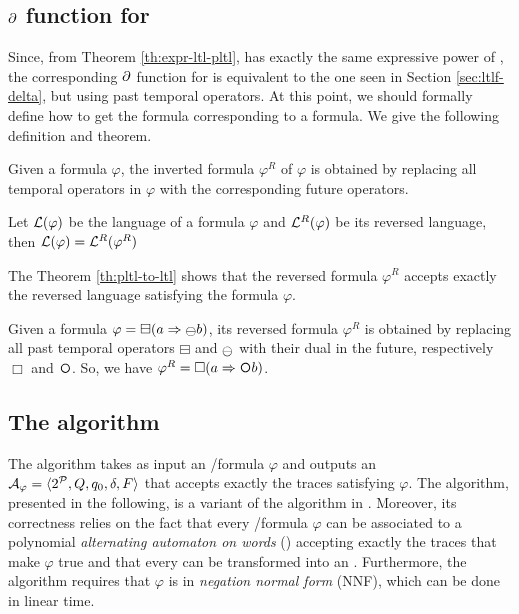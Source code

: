 \subsection{$\partial$ function for \PLTL}\label{sec:pltl-delta}
Since, from Theorem \ref{th:expr-ltl-pltl}, \PLTL has exactly the same expressive power of \LTLf, the corresponding $\partial$ function for \PLTL is equivalent to the one seen in Section \ref{sec:ltlf-delta}, but using past temporal operators. At this point, we should formally define how to get the \LTLf formula corresponding to a \PLTL formula. We give the following definition and theorem.

\begin{definition}\label{def:inverse-formula}
Given a \PLTL formula $\varphi$, the inverted \LTLf formula $\varphi^R$ of $\varphi$ is obtained by replacing all temporal operators in $\varphi$ with the corresponding future operators.
\end{definition}

\begin{theorem}\label{th:pltl-to-ltl}
Let $\mathcal{L}(\varphi)$ be the language of a \PLTL formula $\varphi$ and $\mathcal{L}^R(\varphi)$ be its reversed language, then $\mathcal{L}(\varphi) = \mathcal{L}^R(\varphi^R)$
\end{theorem}

The Theorem \ref{th:pltl-to-ltl} shows that the reversed \LTLf formula $\varphi^R$ accepts exactly the reversed language satisfying the \PLTL formula $\varphi$. 

\begin{example}
Given a \PLTL formula $\varphi = \boxminus(a \Rightarrow \Yesterday b)$, its reversed formula $\varphi^R$ is obtained by replacing all past temporal operators $\boxminus$ and $\Yesterday$ with their dual in the future, respectively $\Box$ and $\Next$. So, we have $\varphi^R = \Box(a \Rightarrow \Next b)$.
\end{example}

\subsection{The \LTLfToNFA algorithm}
The \LTLfToNFA algorithm takes as input an \LTLf/\PLTL formula $\varphi$ and outputs an \NFA $\mathcal{A}_\varphi = \langle 2^{\mathcal{P}}, Q, q_0, \delta, F \rangle$ that accepts exactly the traces satisfying $\varphi$. The algorithm, presented in the following, is a variant of the algorithm in \citep{DeGiacomo:2015:SLL:2832415.2832466}. Moreover, its correctness relies on the fact that every \LTLf/\PLTL formula $\varphi$ can be associated to a polynomial \emph{alternating automaton on words} (\AFW) accepting exactly the traces that make $\varphi$ true and that every \AFW can be transformed into an \NFA \citep{de2013linear}.
Furthermore, the algorithm requires that $\varphi$ is in \emph{negation normal form} (NNF), which can be done in linear time.

